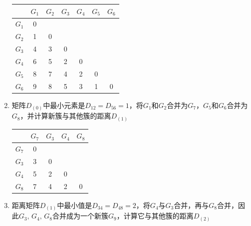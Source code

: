 \begin{example}
\begin{enumerate}
        \begin{table}[htbp]
            \centering
            \begin{tabular}{c|cccccc}
            \hline
                & $G_1$ & $G_2$ & $G_3$ & $G_4$ & $G_5$ & $G_6$ \\
                \hline
            $G_1$ & 0   &     &     &     &     &  \\
            $G_2$ & 1   & 0   &     &     &     &  \\
            $G_3$ & 4   & 3   & 0   &     &     &  \\
            $G_4$ & 6   & 5   & 2   & 0   &     &  \\
            $G_5$ & 8   & 7   & 4   & 2   & 0   &  \\
            $G_6$ & 9   & 8   & 5   & 3   & 1   & 0 \\
            \hline
            \end{tabular}%
        \end{table}%
        \item 矩阵$D_{(0)}$中最小元素是$D_{12}=D_{56} = 1$，将$G_1$和$G_2$合并为$G_7$，$G_5$和$G_6$合并为$G_8$，并计算新簇与其他簇的距离$D_{(1)}$
        \begin{table}[htbp]
            \centering
            \begin{tabular}{c|cccc}
            \hline
                & $G_7$ & $G_3$ & $G_4$ & $G_8$ \bigstrut\\
            \hline
            $G_7$ & 0   &     &     &  \bigstrut[t]\\
            $G_3$ & 3   & 0   &     &  \\
            $G_4$ & 5   & 2   & 0   &  \\
            $G_8$ & 7   & 4   & 2   & 0 \bigstrut[b]\\
            \hline
            \end{tabular}%
        \end{table}%
        \item 距离矩阵$D_{(1)}$中最小值是$D_{34} = D_{48} = 2$，将$G_4$与$G_3$合并，再与$G_8$合并，因此$G_3,\,G_4,\,G_8$合并成为一个新簇$G_9$，计算它与其他簇的距离$D_{(2)}$
        \begin{table}[htbp]
            \centering
            \begin{tabular}{c|cc}
            \hline

\end{tabular}
\end{table}
\end{enumerate}
\end{example}
